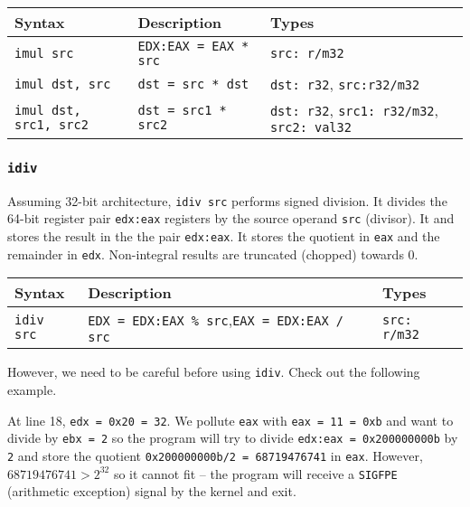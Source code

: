 \documentclass[a4paper]{article}
\begin{document}
\begin{tabular}{p{}p{}p{}} \toprule %
{Syntax} & {Description} & {Types} \\ \midrule
    \texttt{imul src} & {\texttt{EDX:EAX = EAX * src}} & {\texttt{src: r/m32}} \\
    
    \texttt{imul dst, src} & {\texttt{dst = src * dst}} & {\texttt{dst: r32}, \texttt{src:r32/m32}}\\
    \texttt{imul dst, src1, src2} & {\texttt{dst = src1 * src2}} & {\texttt{dst: r32},
    \texttt{src1: r32/m32}, \texttt{src2: val32}} \\ \bottomrule
\end{tabular}



\subsubsection{\texttt{idiv}}

Assuming 32-bit architecture, \texttt{idiv src} performs signed division. It divides the 64-bit register pair  \texttt{edx:eax} registers by the source operand \texttt{src} (divisor). It  and stores the result in the the pair \texttt{edx:eax}. It stores the quotient in \texttt{eax} and the remainder in \texttt{edx}. Non-integral results are truncated (chopped) towards 0.
\begin{tabular}{p{}p{}p{}} \toprule %
{Syntax} & {Description} & {Types} \\ \midrule
    \texttt{idiv src} & {\texttt{EDX = EDX:EAX \% src},\quad\quad\quad\quad\quad\quad\quad \texttt{EAX = EDX:EAX / src}} & {\texttt{src: r/m32}} \\
    \bottomrule
\end{tabular}

However, we need to be careful before using \texttt{idiv}. Check out the following example.

At line 18, \texttt{edx = 0x20 = 32}. We pollute \texttt{eax} with \texttt{eax = 11 = 0xb} and want to divide by \texttt{ebx = 2}  so the program will try to divide \texttt{edx:eax = 0x200000000b} by \texttt{2} and store the quotient \texttt{0x200000000b/2 = 68719476741} in \texttt{eax}. However, $68719476741 > 2^{32}$ so it cannot fit -- the program will receive a \texttt{SIGFPE} (arithmetic exception) signal by the kernel and exit.
\end{document}
